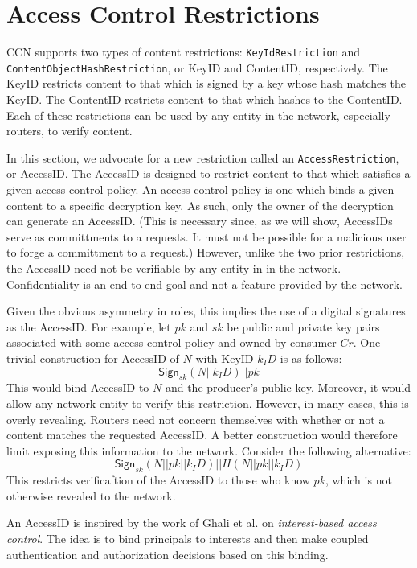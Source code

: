 \section{Access Control Restrictions}
CCN supports two types of content restrictions: {\tt KeyIdRestriction}
and {\tt ContentObjectHashRestriction}, or KeyID and ContentID, respectively.
The KeyID restricts content to that which is signed by a key whose hash matches
the KeyID. The ContentID restricts content to that which hashes to the ContentID.
Each of these restrictions can be used by any entity in the network, especially
routers, to verify content.

In this section, we advocate for a new restriction called an {\tt AccessRestriction},
or AccessID. The AccessID is designed to restrict content to that which satisfies
a given access control policy. An access control policy is one which binds a given
content to a specific decryption key. As such, only the owner of the decryption
can generate an AccessID. (This is necessary since, as we will show, AccessIDs serve
as committments to a requests. It must not be possible for a malicious user to forge
a committment to a request.) However, unlike the two prior restrictions, the AccessID
need not be verifiable by any entity in in the network. Confidentiality is an
end-to-end goal and not a feature provided by the network.

Given the obvious asymmetry in roles, this implies the use of a digital signatures
as the AccessID. For example, let $pk$ and $sk$ be public and private key pairs associated with
some access control policy and owned by consumer $Cr$. One trivial construction for AccessID
of $N$ with KeyID $k_ID$ is as follows:
$$
\mathsf{Sign}_{sk}(N || k_ID) || pk
$$
This would bind AccessID to $N$ and the producer's public key. Moreover, it would
allow any network entity to verify this restriction. However, in many cases, this
is overly revealing. Routers need not concern themselves with whether or not a
content matches the requested AccessID. A better construction would therefore limit
exposing this information to the network. Consider the following alternative:
$$
\mathsf{Sign}_{sk}(N || pk || k_ID) || H(N || pk || k_ID)
$$
This restricts verificaftion of the AccessID to those who know $pk$, which is not
otherwise revealed to the network.

An AccessID is inspired by the work of Ghali et al. \cite{ibac15} on
\emph{interest-based access control}. The idea is to bind principals to
interests and then make coupled authentication and authorization decisions
based on this binding. 
